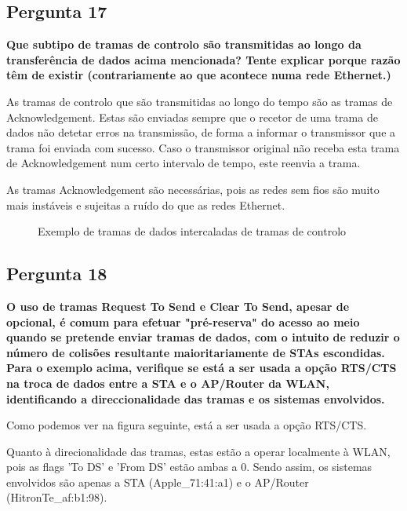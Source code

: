 \documentclass[11pt]{article}
\begin{document}
\subsection{Pergunta 17}

\textbf{Que subtipo de tramas de controlo são transmitidas ao longo da transferência de dados acima mencionada? Tente explicar porque razão têm de existir (contrariamente ao que acontece numa rede Ethernet.)}

As tramas de controlo que são transmitidas ao longo do tempo são as tramas de Acknowledgement. Estas são enviadas sempre que o recetor de uma trama de dados não detetar erros na transmissão, de forma a informar o transmissor que a trama foi enviada com sucesso. Caso o transmissor original não receba esta trama de Acknowledgement num certo intervalo de tempo, este reenvia a trama.

As tramas Acknowledgement são necessárias, pois as redes sem fios são muito mais instáveis e sujeitas a ruído do que as redes Ethernet.

\begin{figure}[hbt!]
    \centering
    \caption{Exemplo de tramas de dados intercaladas de tramas de controlo}
\end{figure}
\clearpage
\subsection{Pergunta 18}

\textbf{O uso de tramas Request To Send e Clear To Send, apesar de opcional, é comum para efetuar "pré-reserva" do acesso ao meio quando se pretende enviar tramas de dados, com o intuito de reduzir o número de colisões resultante maioritariamente de STAs escondidas. Para o exemplo acima, verifique se está a ser usada a opção RTS/CTS na troca de dados entre a STA e o AP/Router da WLAN, identificando a direccionalidade das tramas e os sistemas envolvidos.}

Como podemos ver na figura seguinte, está a ser usada a opção RTS/CTS.

Quanto à direcionalidade das tramas, estas estão a operar localmente à WLAN, pois as flags 'To DS' e 'From DS' estão ambas a 0. Sendo assim, os sistemas envolvidos são apenas a STA (Apple\_71:41:a1) e o AP/Router (HitronTe\_af:b1:98).
\end{document}
